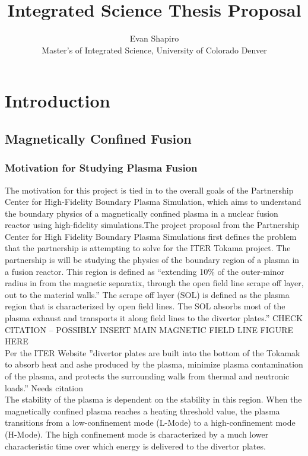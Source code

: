 \documentclass{article}
\title{Integrated Science Thesis Proposal}
\author{Evan Shapiro \\ Master's of Integrated Science, University of Colorado Denver}
\begin{document}
\maketitle
\tableofcontents
\section{Introduction}
\subsection{Magnetically Confined Fusion}
\subsubsection{Motivation for Studying Plasma Fusion}


The motivation for this project is tied in to the overall goals of the Partnership Center for High-Fidelity Boundary Plasma Simulation, which aims to understand the boundary physics of a magnetically confined plasma in a nuclear fusion reactor using high-fidelity simulations.The project proposal from the Partnership Center for High Fidelity Boundary Plasma Simulations first defines the problem that the partnership is attempting to solve for the ITER Tokama project. The partnership is will be studying the physics of the boundary region of a plasma in a fusion reactor. This region is defined as “extending 10\% of the outer-minor radius in from the magnetic separatix, through the open field line scrape off layer, out to the material walls.” The scrape off layer (SOL) is defined as the plasma region that is characterized by open field lines. The SOL absorbs most of the plasma exhaust and transports it along field lines to the divertor plates.” CHECK CITATION – POSSIBLY INSERT MAIN MAGNETIC FIELD LINE FIGURE HERE\\


Per the ITER Website ”divertor plates are built into the bottom of the Tokamak to absorb heat and ashe produced by the plasma, minimize plasma contamination of the plasma, and protects the surrounding walls from thermal and neutronic loads.” Needs citation\\


The stability of the plasma is dependent on the stability in this region. When the magnetically confined plasma reaches a heating threshold value, the plasma transitions from a low-confinement mode (L-Mode) to a high-confinement mode (H-Mode). The high confinement mode is characterized by a much lower characteristic time over which energy is delivered to the divertor plates. \\
\end{document}

